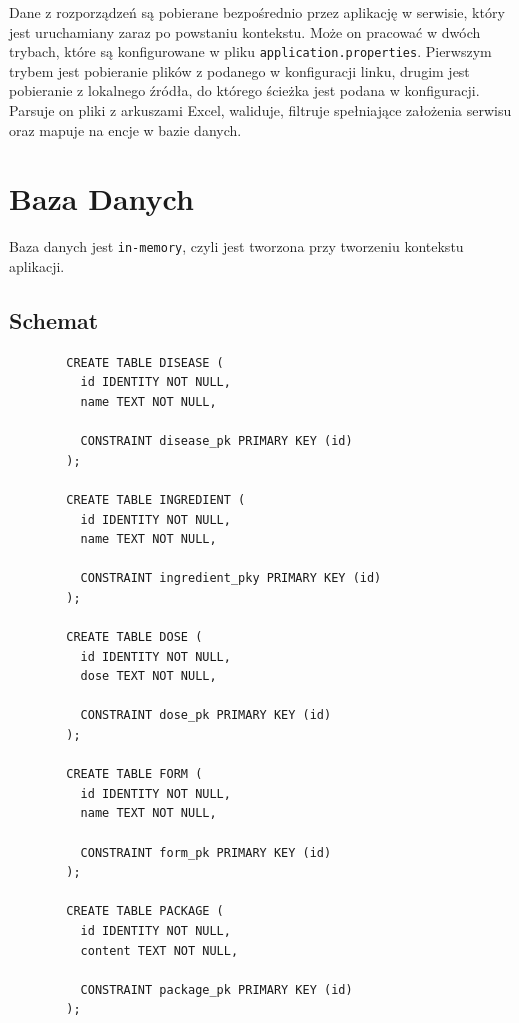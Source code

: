 \documentclass{article}
\begin{document}
    Dane z rozporządzeń są pobierane bezpośrednio przez aplikację w serwisie, który jest uruchamiany zaraz po powstaniu kontekstu.
    Może on pracować w dwóch trybach, które są konfigurowane w pliku \texttt{application.properties}.
    Pierwszym trybem jest pobieranie plików z podanego w konfiguracji linku,
    drugim jest pobieranie z lokalnego źródła, do którego ścieżka jest podana w konfiguracji.
    Parsuje on pliki z arkuszami Excel, waliduje, filtruje spełniające założenia serwisu oraz mapuje na encje w bazie danych.
  \section{Baza Danych}
  Baza danych jest \texttt{in-memory}, czyli jest tworzona przy tworzeniu kontekstu aplikacji.

  \subsection{Schemat}
    \noindent
    \begin{minipage}{.45\textwidth}
      \begin{lstlisting}
        CREATE TABLE DISEASE (
          id IDENTITY NOT NULL,
          name TEXT NOT NULL,

          CONSTRAINT disease_pk PRIMARY KEY (id)
        );

        CREATE TABLE INGREDIENT (
          id IDENTITY NOT NULL,
          name TEXT NOT NULL,

          CONSTRAINT ingredient_pky PRIMARY KEY (id)
        );

        CREATE TABLE DOSE (
          id IDENTITY NOT NULL,
          dose TEXT NOT NULL,

          CONSTRAINT dose_pk PRIMARY KEY (id)
        );

        CREATE TABLE FORM (
          id IDENTITY NOT NULL,
          name TEXT NOT NULL,

          CONSTRAINT form_pk PRIMARY KEY (id)
        );

        CREATE TABLE PACKAGE (
          id IDENTITY NOT NULL,
          content TEXT NOT NULL,

          CONSTRAINT package_pk PRIMARY KEY (id)
        );
      \end{lstlisting}
    \end{minipage}\hfill
\end{document}
